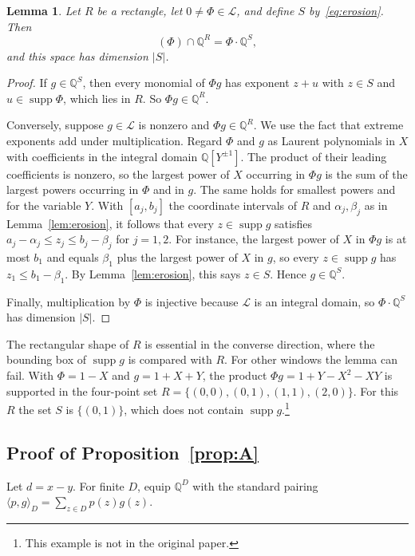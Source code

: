 \documentclass[11pt,a4paper,reqno]{amsart}
\newtheorem{lemma}[theorem]{Lemma}
\theoremstyle{definition}
\theoremstyle{remark}
\newcommand{\Q}{\mathbb Q}
\newcommand{\LL}{\mathcal L}
\DeclareMathOperator{\supp}{supp}
\numberwithin{equation}{section}
\begin{document}
\begin{lemma}\label{lem:supported}
Let $R$ be a rectangle, let $0\ne\Phi\in\LL$, and define $S$ by~\eqref{eq:erosion}. Then
\[
 (\Phi)\cap\Q^R=\Phi\cdot\Q^S,
\]
and this space has dimension $|S|$.
\end{lemma}

\begin{proof}
If $g\in\Q^S$, then every monomial of $\Phi g$ has exponent $z+u$ with $z\in S$ and $u\in\supp\Phi$, which lies in $R$. So $\Phi g\in\Q^R$.

Conversely, suppose $g\in\LL$ is nonzero and $\Phi g\in\Q^R$. We use the fact that extreme exponents add under multiplication. Regard $\Phi$ and $g$ as Laurent polynomials in $X$ with coefficients in the integral domain $\Q[Y^{\pm1}]$. The product of their leading coefficients is nonzero, so the largest power of $X$ occurring in $\Phi g$ is the sum of the largest powers occurring in $\Phi$ and in $g$. The same holds for smallest powers and for the variable $Y$. With $[a_j,b_j]$ the coordinate intervals of $R$ and $\alpha_j,\beta_j$ as in Lemma~\ref{lem:erosion}, it follows that every $z\in\supp g$ satisfies $a_j-\alpha_j\le z_j\le b_j-\beta_j$ for $j=1,2$. For instance, the largest power of $X$ in $\Phi g$ is at most $b_1$ and equals $\beta_1$ plus the largest power of $X$ in $g$, so every $z\in\supp g$ has $z_1\le b_1-\beta_1$. By Lemma~\ref{lem:erosion}, this says $z\in S$. Hence $g\in\Q^S$.

Finally, multiplication by $\Phi$ is injective because $\LL$ is an integral domain, so $\Phi\cdot\Q^S$ has dimension $|S|$.
\end{proof}

The rectangular shape of $R$ is essential in the converse direction, where the bounding box of $\supp g$ is compared with $R$. For other windows the lemma can fail. With $\Phi=1-X$ and $g=1+X+Y$, the product $\Phi g=1+Y-X^2-XY$ is supported in the four-point set $R=\{(0,0),(0,1),(1,1),(2,0)\}$. For this $R$ the set $S$ is $\{(0,1)\}$, which does not contain $\supp g$.\footnote{This example is not in the original paper.}

\subsection{Proof of Proposition~\ref{prop:A}}\label{ssec:proofA}
Let $d=x-y$. For finite $D$, equip $\Q^D$ with the standard pairing $\langle p,g\rangle_D=\sum_{z\in D}p(z)g(z)$.
\end{document}
